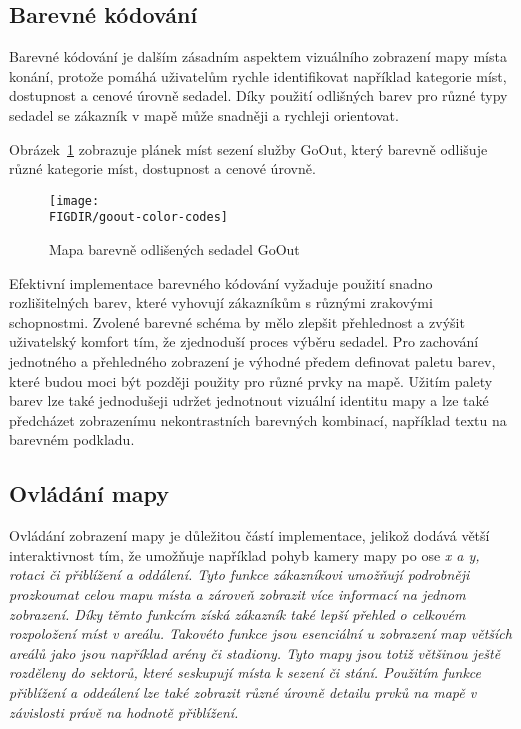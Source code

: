 \subsection{Barevné kódování}
\label{subsec:specifikace-interaktivni-mapa-barevne-kody}
Barevné kódování je dalším zásadním aspektem vizuálního zobrazení mapy místa konání, protože pomáhá uživatelům rychle identifikovat například kategorie míst, dostupnost a cenové úrovně sedadel.
Díky použití odlišných barev pro různé typy sedadel se zákazník v mapě může snadněji a rychleji orientovat.

Obrázek~\ref{fig:goout-color-codes} zobrazuje plánek míst sezení služby GoOut, který barevně odlišuje různé kategorie míst, dostupnost a cenové úrovně.

\begin{figure}[H]
    \texttt{[image: \\FIGDIR/goout-color-codes]}
    \centering
    \caption{Mapa barevně odlišených sedadel GoOut}
    \label{fig:goout-color-codes}
\end{figure}

Efektivní implementace barevného kódování vyžaduje použití snadno rozlišitelných barev, které vyhovují zákazníkům s různými zrakovými schopnostmi.
Zvolené barevné schéma by mělo zlepšit přehlednost a zvýšit uživatelský komfort tím, že zjednoduší proces výběru sedadel.
Pro zachování jednotného a přehledného zobrazení je výhodné předem definovat paletu barev, které budou moci být později použity pro různé prvky na mapě.
Užitím palety barev lze také jednodušeji udržet jednotnout vizuální identitu mapy a lze také předcházet zobrazenímu nekontrastních barevných kombinací, například textu na barevném podkladu.

\subsection{Ovládání mapy}
\label{subsec:specifikace-interaktivni-mapa-ovladani}
Ovládání zobrazení mapy je důležitou částí implementace, jelikož dodává větší interaktivnost tím, že umožňuje například pohyb kamery mapy po ose \em{x} a \em{y}, rotaci či přiblížení a oddálení.
Tyto funkce zákazníkovi umožňují podrobněji prozkoumat celou mapu místa a zároveň zobrazit více informací na jednom zobrazení.
Díky těmto funkcím získá zákazník také lepší přehled o celkovém rozpoložení míst v areálu.
Takovéto funkce jsou esenciální u zobrazení map větších areálů jako jsou například arény či stadiony.
Tyto mapy jsou totiž většinou ještě rozděleny do sektorů, které seskupují místa k sezení či stání.
Použitím funkce přiblížení a oddeálení lze také zobrazit různé úrovně detailu prvků na mapě v závislosti právě na hodnotě přiblížení.

